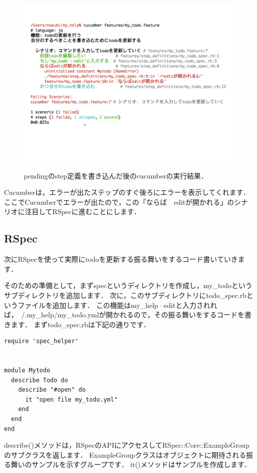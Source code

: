 \begin{figure}[htbp]\begin{center}
\includegraphics[width=12cm,bb= 0 0 937 753]{../figs/./my_help_nasu.005.jpeg}
\caption{pendingのstep定義を書き込んだ後のcucumberの実行結果．}
\label{fig:005}
\label{default}\end{center}\end{figure}
Cucumberは，エラーが出たステップのすぐ後ろにエラーを表示してくれます．
ここでCucumberでエラーが出たので，この「ならば　editが開かれる」のシナリオに注目してRSpecに進むことにします．

\subsection{RSpec}
次にRSpecを使って実際にtodoを更新する振る舞いをするコード書いていきます．

そのための準備として，まずspecというディレクトリを作成し，my\_todoというサブディレクトリを追加します．
次に，このサブディレクトリにtodo\_spec.rbというファイルを追加します．
この機能はmy\_help --editと入力されれば，~/.my\_help/my\_todo.ymlが開かれるので，その振る舞いをするコードを書きます．
まずtodo\_spec.rbは下記の通りです．
\begin{lstlisting}[style=customRuby,basicstyle={\scriptsize\ttfamily}]
require 'spec_helper'


module Mytodo
  describe Todo do
    describe "#open" do
      it "open file my_todo.yml" 
    end
  end
end

\end{lstlisting}
describe()メソッドは，RSpecのAPIにアクセスしてRSpec::Core::ExampleGroupのサブクラスを返します．
ExampleGroupクラスはオブジェクトに期待される振る舞いのサンプルを示すグループです．
it()メソッドはサンプルを作成します．

